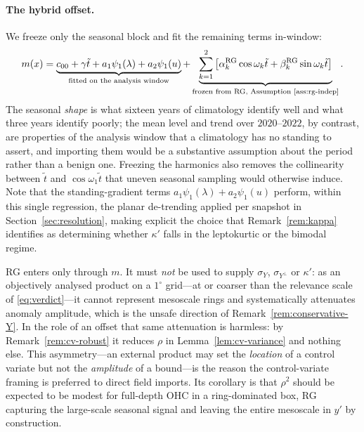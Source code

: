 \paragraph{The hybrid offset.} We freeze only the seasonal block and fit
the remaining terms in-window:
\begin{equation}
  m(x)=
  \underbrace{c_{00}+\gamma\tilde t+a_1\psi_1(\lambda)+a_2\psi_1(u)}
    _{\text{fitted on the analysis window}}
  +\underbrace{\sum_{k=1}^{2}
    \big[\alpha^{\mathrm{RG}}_k\cos\omega_k\tilde t
        +\beta^{\mathrm{RG}}_k\sin\omega_k\tilde t\big]}
    _{\text{frozen from RG, Assumption~\ref{ass:rg-indep}}} .
  \label{eq:hybrid-offset}
\end{equation}
The seasonal \emph{shape} is what sixteen years of climatology identify
well and what three years identify poorly; the mean level and trend over
$2020$--$2022$, by contrast, are properties of the analysis window that
a climatology has no standing to assert, and importing them would be a
substantive assumption about the period rather than a benign one.
Freezing the harmonics also removes the collinearity between $\tilde t$
and $\cos\omega_1\tilde t$ that uneven seasonal sampling would otherwise
induce. Note that the standing-gradient terms $a_1\psi_1(\lambda)
+a_2\psi_1(u)$ perform, within this single regression, the planar
de-trending applied per snapshot in Section~\ref{sec:resolution}, making
explicit the choice that Remark~\ref{rem:kappa} identifies as
determining whether $\kappa'$ falls in the leptokurtic or the bimodal
regime.

\begin{remark}
\label{rem:rg-scope}
RG enters only through $m$. It must \emph{not} be used to supply
$\sigma_{Y}$, $\sigma_{Y^{\perp}}$ or $\kappa'$: as an objectively
analysed product on a $1^\circ$ grid---at or coarser than the relevance
scale of \eqref{eq:verdict}---it cannot represent mesoscale rings and
systematically attenuates anomaly amplitude, which is the unsafe
direction of Remark~\ref{rem:conservative-Y}. In the role of an offset
that same attenuation is harmless: by Remark~\ref{rem:cv-robust} it
reduces $\rho$ in Lemma~\ref{lem:cv-variance} and nothing else. This
asymmetry---an external product may set the \emph{location} of a control
variate but not the \emph{amplitude} of a bound---is the reason the
control-variate framing is preferred to direct field imports. Its
corollary is that $\rho^2$ should be expected to be modest for
full-depth OHC in a ring-dominated box, RG capturing the large-scale
seasonal signal and leaving the entire mesoscale in $y'$ by
construction.
\end{remark}

